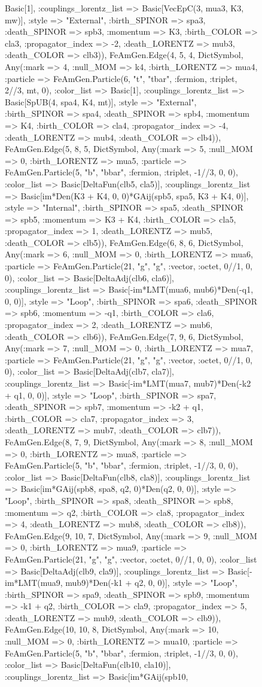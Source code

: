 \documentclass{revtex4}
\begin{document}
\begin{figure}[!htb]
\begin{center}
{Basic[1], :couplings_lorentz_list => Basic[VecEpC(3, mua3, K3, mw)], :style => "External", :birth_SPINOR => spa3, :death_SPINOR => spb3, :momentum => K3, :birth_COLOR => cla3, :propagator_index => -2, :death_LORENTZ => mub3, :death_COLOR => clb3)), FeAmGen.Edge(4, 5, 4, Dict{Symbol, Any}(:mark => 4, :null_MOM => k4, :birth_LORENTZ => mua4, :particle => FeAmGen.Particle(6, "t", "tbar", :fermion, :triplet, 2//3, mt, 0), :color_list => Basic[1], :couplings_lorentz_list => Basic[SpUB(4, spa4, K4, mt)], :style => "External", :birth_SPINOR => spa4, :death_SPINOR => spb4, :momentum => K4, :birth_COLOR => cla4, :propagator_index => -4, :death_LORENTZ => mub4, :death_COLOR => clb4)), FeAmGen.Edge(5, 8, 5, Dict{Symbol, Any}(:mark => 5, :null_MOM => 0, :birth_LORENTZ => mua5, :particle => FeAmGen.Particle(5, "b", "bbar", :fermion, :triplet, -1//3, 0, 0), :color_list => Basic[DeltaFun(clb5, cla5)], :couplings_lorentz_list => Basic[im*Den(K3 + K4, 0, 0)*GAij(spb5, spa5, K3 + K4, 0)], :style => "Internal", :birth_SPINOR => spa5, :death_SPINOR => spb5, :momentum => K3 + K4, :birth_COLOR => cla5, :propagator_index => 1, :death_LORENTZ => mub5, :death_COLOR => clb5)), FeAmGen.Edge(6, 8, 6, Dict{Symbol, Any}(:mark => 6, :null_MOM => 0, :birth_LORENTZ => mua6, :particle => FeAmGen.Particle(21, "g", "g", :vector, :octet, 0//1, 0, 0), :color_list => Basic[DeltaAdj(clb6, cla6)], :couplings_lorentz_list => Basic[-im*LMT(mua6, mub6)*Den(-q1, 0, 0)], :style => "Loop", :birth_SPINOR => spa6, :death_SPINOR => spb6, :momentum => -q1, :birth_COLOR => cla6, :propagator_index => 2, :death_LORENTZ => mub6, :death_COLOR => clb6)), FeAmGen.Edge(7, 9, 6, Dict{Symbol, Any}(:mark => 7, :null_MOM => 0, :birth_LORENTZ => mua7, :particle => FeAmGen.Particle(21, "g", "g", :vector, :octet, 0//1, 0, 0), :color_list => Basic[DeltaAdj(clb7, cla7)], :couplings_lorentz_list => Basic[-im*LMT(mua7, mub7)*Den(-k2 + q1, 0, 0)], :style => "Loop", :birth_SPINOR => spa7, :death_SPINOR => spb7, :momentum => -k2 + q1, :birth_COLOR => cla7, :propagator_index => 3, :death_LORENTZ => mub7, :death_COLOR => clb7)), FeAmGen.Edge(8, 7, 9, Dict{Symbol, Any}(:mark => 8, :null_MOM => 0, :birth_LORENTZ => mua8, :particle => FeAmGen.Particle(5, "b", "bbar", :fermion, :triplet, -1//3, 0, 0), :color_list => Basic[DeltaFun(clb8, cla8)], :couplings_lorentz_list => Basic[im*GAij(spb8, spa8, q2, 0)*Den(q2, 0, 0)], :style => "Loop", :birth_SPINOR => spa8, :death_SPINOR => spb8, :momentum => q2, :birth_COLOR => cla8, :propagator_index => 4, :death_LORENTZ => mub8, :death_COLOR => clb8)), FeAmGen.Edge(9, 10, 7, Dict{Symbol, Any}(:mark => 9, :null_MOM => 0, :birth_LORENTZ => mua9, :particle => FeAmGen.Particle(21, "g", "g", :vector, :octet, 0//1, 0, 0), :color_list => Basic[DeltaAdj(clb9, cla9)], :couplings_lorentz_list => Basic[-im*LMT(mua9, mub9)*Den(-k1 + q2, 0, 0)], :style => "Loop", :birth_SPINOR => spa9, :death_SPINOR => spb9, :momentum => -k1 + q2, :birth_COLOR => cla9, :propagator_index => 5, :death_LORENTZ => mub9, :death_COLOR => clb9)), FeAmGen.Edge(10, 10, 8, Dict{Symbol, Any}(:mark => 10, :null_MOM => 0, :birth_LORENTZ => mua10, :particle => FeAmGen.Particle(5, "b", "bbar", :fermion, :triplet, -1//3, 0, 0), :color_list => Basic[DeltaFun(clb10, cla10)], :couplings_lorentz_list => Basic[im*GAij(spb10, }
\end{center}
\end{figure}
\end{document}
